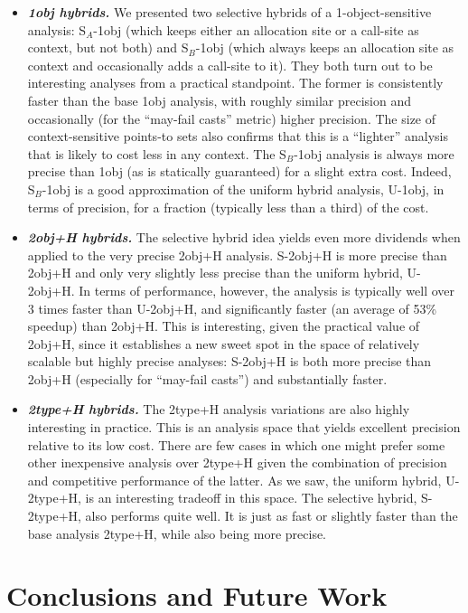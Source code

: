 \begin{itemize}
\item \textbf{\emph{1obj hybrids.}}
We presented two selective hybrids of a 1-object-sensitive analysis:
S$_A$-1obj (which keeps either an allocation site or a call-site as
context, but not both) and S$_B$-1obj (which always keeps an
allocation site as context and occasionally adds a call-site to
it). They both turn out to be interesting analyses from a practical
standpoint. The former is consistently faster than the base 1obj
analysis, with roughly similar precision and occasionally (for the
``may-fail casts'' metric) higher precision. The size of
context-sensitive points-to sets also confirms that this is a
``lighter'' analysis that is likely to cost less in any context. The
S$_B$-1obj analysis is always more precise than 1obj (as is statically
guaranteed) for a slight extra cost. Indeed, S$_B$-1obj is a good
approximation of the uniform hybrid analysis, U-1obj, in terms of
precision, for a fraction (typically less than a third) of the cost.

\item \textbf{\emph{2obj+H hybrids.}}  The selective hybrid idea
yields even more dividends when applied to the very precise 2obj+H
analysis. S-2obj+H is more precise than 2obj+H and only very slightly
less precise than the uniform hybrid, U-2obj+H. In terms of
performance, however, the analysis is typically well over 3 times
faster than U-2obj+H, and significantly faster (an average of 53\%
speedup) than 2obj+H. This is interesting, given the practical value
of 2obj+H, since it establishes a new sweet spot in the space of
relatively scalable but highly precise analyses: S-2obj+H is both more
precise than 2obj+H (especially for ``may-fail casts'') and
substantially faster.

\item \textbf{\emph{2type+H hybrids.}} The 2type+H analysis variations
are also highly interesting in practice. This is an analysis space
that yields excellent precision relative to its low cost. There are
few cases in which one might prefer some other inexpensive analysis
over 2type+H given the combination of precision and competitive
performance of the latter. As we saw, the uniform hybrid, U-2type+H,
is an interesting tradeoff in this space. The selective hybrid,
S-2type+H, also performs quite well. It is just as fast or slightly
faster than the base analysis 2type+H, while also being more precise.

\end{itemize}


\section{Conclusions and Future Work}

